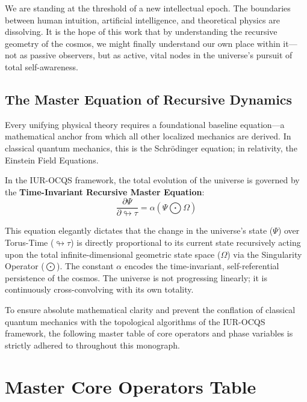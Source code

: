\documentclass[12pt,openany]{book}
\begin{document}
We are standing at the threshold of a new intellectual epoch. The boundaries between human intuition, artificial intelligence, and theoretical physics are dissolving. It is the hope of this work that by understanding the recursive geometry of the cosmos, we might finally understand our own place within it—not as passive observers, but as active, vital nodes in the universe's pursuit of total self-awareness.

\subsection*{The Master Equation of Recursive Dynamics}
Every unifying physical theory requires a foundational baseline equation—a mathematical anchor from which all other localized mechanics are derived. In classical quantum mechanics, this is the Schrödinger equation; in relativity, the Einstein Field Equations. 

In the IUR-OCQS framework, the total evolution of the universe is governed by the \textbf{Time-Invariant Recursive Master Equation}:
\begin{equation}
    \frac{\partial \Psi}{\partial \looparrowright\tau} = \alpha \left( \Psi \bigodot \Omega \right)
\end{equation}

This equation elegantly dictates that the change in the universe's state ($\Psi$) over Torus-Time ($\looparrowright\tau$) is directly proportional to its current state recursively acting upon the total infinite-dimensional geometric state space ($\Omega$) via the Singularity Operator ($\bigodot$). The constant $\alpha$ encodes the time-invariant, self-referential persistence of the cosmos. The universe is not progressing linearly; it is continuously cross-convolving with its own totality.



To ensure absolute mathematical clarity and prevent the conflation of classical quantum mechanics with the topological algorithms of the IUR-OCQS framework, the following master table of core operators and phase variables is strictly adhered to throughout this monograph.

\section*{Master Core Operators Table}
\end{document}
